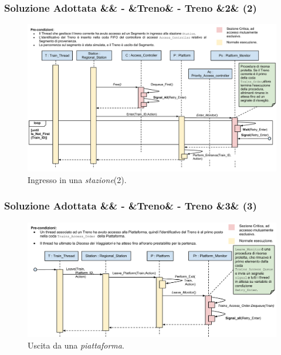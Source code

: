 \documentclass[slidestop,compress,blackandwhite]{beamer}
\newcommand{\ii}[1]{\textit{#1}}
\newcommand{\stazione}{\ii{stazione}}
\newcommand{\piattaforma}{\ii{piattaforma}}
\newcommand{\newtitle}[4]{
	#1 
	\ifx&#2&%
	\else
  		\large- #2
	\fi
	\ifx&#3&%
	\else
  		\normalsize- #3
	\fi
	\ifx&#4&%
	\else
  		\normalsize (#4)
	\fi
}
\newcommand{\newframe}[5]{
	\begin{frame}
		\frametitle{\newtitle{#1}{#2}{#3}{#4}}
		#5
	\end{frame}
}
\begin{document}
	\newframe{Soluzione Adottata}{}{Treno}{2}{
	
		\begin{figure}
			\includegraphics[scale=0.27,trim=0mm 20mm 0mm 20mm]{imgs/platform_access_2}
			\caption{\scriptsize Ingresso in una \stazione (2).}
		\end{figure}
		
	}

	\newframe{Soluzione Adottata}{}{Treno}{3}{
	
		\begin{figure}
			\includegraphics[scale=0.27,trim=0mm 0mm 0mm 0mm]{imgs/platform_exit}
			\caption{\scriptsize Uscita da una \piattaforma.}
		\end{figure}
		
	}
\end{document}
